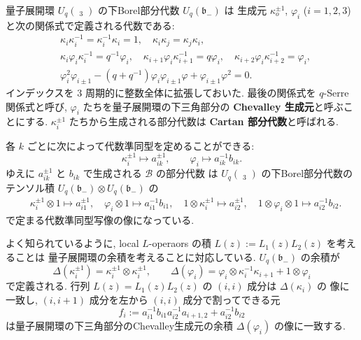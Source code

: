 \documentclass[12pt,twoside,dvipdfm]{msjproc}
\theoremstyle{definition} %
\theoremstyle{definition} %
\theoremstyle{definition} %
\numberwithin{theorem}{section}
\numberwithin{equation}{section}
\numberwithin{figure}{section}
\numberwithin{table}{section}
\newcommand\bor{\mathfrak{b}}
\newcommand\B{\mathcal{B}}
\newcommand\glhat{\mathop{\widehat{\mathrm{gl}}}\nolimits}
\begin{document}
量子展開環 $U_q(\glhat_3)$ の下Borel部分代数 $U_q(\bor_-)$ は
生成元 $\kappa_o^{\pm 1}$, $\varphi_i$ ($i=1,2,3$) と次の関係式で定義される代数である:
\begin{align*}
 &
 \kappa_i\kappa_i^{-1} = \kappa_i^{-1}\kappa_i = 1, \quad
 \kappa_i\kappa_j = \kappa_j\kappa_i,
 \\ &
 \kappa_i \varphi_i \kappa_i^{-1} = q^{-1} \varphi_i, \quad
 \kappa_{i+1} \varphi_i \kappa_{i+1}^{-1} = q \varphi_i, \quad
 \kappa_{i+2} \varphi_i \kappa_{i+2}^{-1} = \varphi_i,
 \\ &
 \varphi_i^2 \varphi_{i\pm1} 
 - (q+q^{-1})\varphi_i\varphi_{i\pm1}\varphi
 + \varphi_{i\pm1}\varphi^2 = 0.
\end{align*}
インデックスを $3$ 周期的に整数全体に拡張しておいた.
最後の関係式を $q$-Serre 関係式と呼び, 
$\varphi_i$ たちを量子展開環の下三角部分の {\bf Chevalley 生成元}と呼ぶことにする.
$\kappa_i^{\pm1}$ たちから生成される部分代数は {\bf Cartan 部分代数}と呼ばれる.


各 $k$ ごとに次によって代数準同型を定めることができる:
\begin{equation*}
  \kappa_i^{\pm1}\mapsto a_{ik}^{\pm1},  \qquad
  \varphi_i \mapsto a_{ik}^{-1} b_{ik}.
\end{equation*}
ゆえに $a_{ik}^{\pm 1}$ と $b_{ik}$ で生成される $\B$ の部分代数
は $U_q(\glhat_3)$ の下Borel部分代数の
テンソル積 $U_q(\bor_-)\otimes U_q(\bor_-)$ の
\begin{align*}
  &
  \kappa_i^{\pm1}\otimes 1 \mapsto a_{i1}^{\pm1},  \quad
  \varphi_i\otimes 1 \mapsto a_{i1}^{-1} b_{i1},
\quad
  1\otimes \kappa_i^{\pm1} \mapsto a_{i2}^{\pm1},  \quad
  1\otimes\varphi_i\otimes 1 \mapsto a_{i2}^{-1} b_{i2}.
\end{align*}
で定まる代数準同型写像の像になっている.

よく知られているように, local $L$-operaors の積 $L(z):=L_1(z)L_2(z)$ を考えることは
量子展開環の余積を考えることに対応している.
$U_q(\bor_-)$ の余積が
\begin{equation*}
  \Delta(\kappa_i^{\pm1}) = \kappa_i^{\pm1}\otimes\kappa_i^{\pm1}, \qquad
  \Delta(\varphi_i) 
  = \varphi_i\otimes \kappa_i^{-1}\kappa_{i+1} + 1\otimes\varphi_i
\end{equation*}
で定義される. 行列 $L(z)=L_1(z)L_2(z)$ の $(i,i)$ 成分は $\Delta(\kappa_i)$ の
像に一致し, $(i,i+1)$ 成分を左から $(i,i)$ 成分で割ってできる元
\begin{equation*}
  f_i := a_{i1}^{-1}b_{i1}a_{i2}^{-1}a_{i+1,2} + a_{i2}^{-1}b_{i2}
\end{equation*}
は量子展開環の下三角部分のChevalley生成元の余積 $\Delta(\varphi_i)$ の像に一致する.
	
\end{document}
